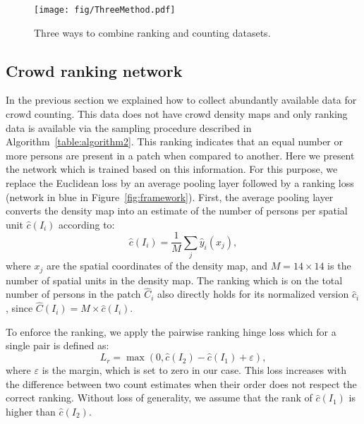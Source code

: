 \documentclass[10pt,twocolumn,letterpaper]{article}
\begin{document}
\begin{figure}[tpb]
\centering
  \texttt{[image: fig/ThreeMethod.pdf]}
  \caption{Three ways to combine ranking and counting datasets.}
  \label{fig:three}
\end{figure}



\subsection{Crowd ranking network}
In the previous section we explained how to collect abundantly
available data for crowd counting. This data does not have crowd
density maps and only ranking data is available via the sampling
procedure described in Algorithm~\ref{table:algorithm2}. This ranking
indicates that an equal number or more persons are
present in a patch when compared to another. Here we present the
network which is trained based on this information.
For this purpose, we replace the Euclidean loss by an average pooling
layer followed by a ranking loss (network in blue in
Figure~\ref{fig:framework}). First, the average pooling layer converts
the density map into an estimate of the number of persons per spatial
unit $\hat c(I_i)$ according to:
\begin{equation}
\hat c\left(I_i \right) = \frac{1}{M}\sum\limits_j {\hat y_i \left( {x_j } \right)},
\end{equation}
where $x_j$ are the spatial coordinates of the density map, and
$M=14\times14$ is the number of spatial units in the density map. The
ranking which is on the total number of persons in the patch
$\hat C_i$ also directly holds for its normalized version $\hat c_i$,
since $\hat C\left(I_i \right)=M\times \hat c\left(I_i \right)$.

To enforce the ranking, we apply the pairwise ranking hinge loss which
for a single pair is defined as:
\begin{equation} \label{eq:ranking}
L_r = \max{(0,\hat c \left(I_2\right)- \hat c\left(I_1\right)+\varepsilon )},
\end{equation}
where $\varepsilon$ is the margin, which is set to zero in our
case. This loss increases with the difference between two count
estimates when their order does not respect the correct
ranking. Without loss of generality, we assume that the rank of $\hat
c(I_1)$ is higher than $\hat c(I_2)$.
\end{document}
